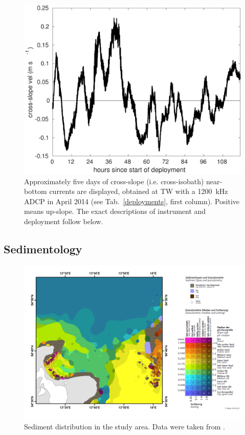   \begin{figure}[ht]
\includegraphics[width=30pc]{bilder/abslope.pdf}
 \caption{Approximately five days of cross-slope (i.e. cross-isobath) 
near-bottom currents are displayed, obtained at TW with a 1200~kHz ADCP in 
April 
2014 (see Tab.\ \ref{deployments}, first column). Positive means up-slope. The 
exact descriptions of instrument and deployment follow below.} \label{abslope}
 \end{figure}

 \FloatBarrier
\subsection{Sedimentology}\label{sedmol}

 \begin{figure}[ht]
\includegraphics[width=40pc]{bilder/TW.pdf}
 \caption{Sediment distribution in the study area. Data were taken from 
\cite{tauber2012}.}
 \label{tauberkarte}
 \end{figure}
 
